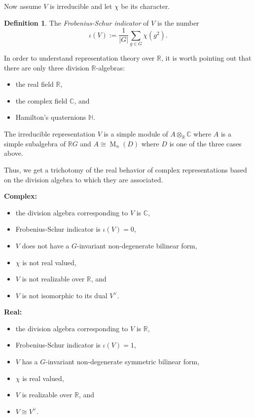 \documentclass[12pt]{article}
\theoremstyle{plain}
\theoremstyle{definition}
\newtheorem{definition}[theorem]{Definition}
\theoremstyle{remark}
\numberwithin{equation}{section}
\begin{document}
Now assume $V$ is irreducible and let $\chi$ be its character.

\begin{definition}
The \emph{Frobenius-Schur indicator} of $V$ is the number
\[
\iota(V) := \frac{1}{|G|}\sum_{g \in G} \chi(g^2).
\]
\end{definition}

In order to understand representation theory over $\mathbb{R}$, it is
worth pointing out that there are only three division
$\mathbb{R}$-algebras:
\begin{itemize}
\item the real field $\mathbb{R}$,
\item the complex field $\mathbb{C}$, and
\item Hamilton's quaternions $\mathbb{H}$.
\end{itemize}
The irreducible representation $V$ is a simple module of
$A \otimes_{\mathbb{R}} \mathbb{C}$ where $A$ is a simple subalgebra of
$\mathbb{R}G$ and $A \cong \operatorname{M}_n(D)$ where $D$ is one of
the three cases above.

Thus, we get a trichotomy of the real behavior of complex
representations based on the division algebra to which they are
associated.

\pagebreak

\noindent
\textbf{Complex:}
\begin{itemize}
\item the division algebra corresponding to $V$ is $\mathbb{C}$,
\item Frobenius-Schur indicator is $\iota(V)=0$,
\item $V$ does not have a $G$-invariant non-degenerate bilinear form,
\item $\chi$ is not real valued,
\item $V$ is not realizable over $\mathbb{R}$, and
\item $V$ is not isomorphic to its dual $V^\vee$.
\end{itemize}

\noindent
\textbf{Real:}
\begin{itemize}
\item the division algebra corresponding to $V$ is $\mathbb{R}$,
\item Frobenius-Schur indicator is $\iota(V)=1$,
\item $V$ has a $G$-invariant non-degenerate symmetric bilinear form,
\item $\chi$ is real valued,
\item $V$ is realizable over $\mathbb{R}$, and
\item $V \cong V^\vee$.
\end{itemize}
\end{document}

